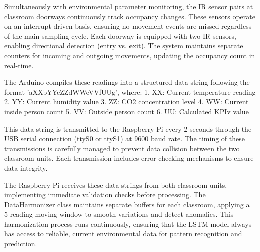 Simultaneously with environmental parameter monitoring, the IR sensor pairs at classroom doorways continuously track occupancy changes. These sensors operate on an interrupt-driven basis, ensuring no movement events are missed regardless of the main sampling cycle. Each doorway is equipped with two IR sensors, enabling directional detection (entry vs. exit). The system maintains separate counters for incoming and outgoing movements, updating the occupancy count in real-time.

The Arduino compiles these readings into a structured data string following the format 'aXXbYYcZZdWWeVVfUUg\n', where:
1. XX: Current temperature reading
2. YY: Current humidity value
3. ZZ: CO2 concentration level
4. WW: Current inside person count
5. VV: Outside person count
6. UU: Calculated KPIv value

This data string is transmitted to the Raspberry Pi every 2 seconds through the USB serial connection (ttyS0 or ttyS1) at 9600 baud rate. The timing of these transmissions is carefully managed to prevent data collision between the two classroom units. Each transmission includes error checking mechanisms to ensure data integrity.

The Raspberry Pi receives these data strings from both classroom units, implementing immediate validation checks before processing. The DataHarmonizer class maintains separate buffers for each classroom, applying a 5-reading moving window to smooth variations and detect anomalies. This harmonization process runs continuously, ensuring that the LSTM model always has access to reliable, current environmental data for pattern recognition and prediction.

